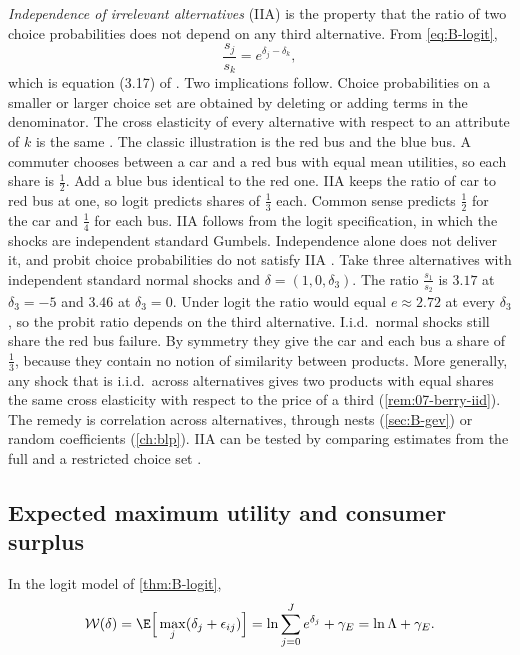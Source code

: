 \emph{Independence of irrelevant alternatives} (IIA) is the property that the ratio of two choice
probabilities does not depend on any third alternative. From \eqref{eq:B-logit},
\begin{equation}\label{eq:B-iia}
\frac{s_j}{s_k} = e^{\delta_j - \delta_k},
\end{equation}
which is equation (3.17) of \citet[p.~1413]{McFadden1984}. Two implications follow. Choice probabilities
on a smaller or larger choice set are obtained by deleting or adding terms in the denominator. The cross
elasticity of every alternative with respect to an attribute of $k$ is the same \citep[p.~1414]{McFadden1984}.
The classic illustration is the red bus and the blue bus. A commuter chooses between a car and a red bus
with equal mean utilities, so each share is $\frac{1}{2}$. Add a blue bus identical to the red one. IIA keeps
the ratio of car to red bus at one, so logit predicts shares of $\frac{1}{3}$ each. Common sense predicts
$\frac{1}{2}$ for the car and $\frac{1}{4}$ for each bus. IIA follows from the logit specification, in which
the shocks are independent standard Gumbels. Independence alone does not deliver it, and probit choice
probabilities do not satisfy IIA \citep[Section~5.4, p.~108]{Train2009}. Take three alternatives with
independent standard normal shocks and $\delta = (1, 0, \delta_3)$. The ratio $\frac{s_1}{s_2}$ is $3.17$ at
$\delta_3 = -5$ and $3.46$ at $\delta_3 = 0$. Under logit the ratio would equal $e \approx 2.72$ at every
$\delta_3$, so the probit ratio depends on the third alternative. I.i.d.\ normal shocks still share the red bus
failure. By symmetry they give the car and each bus a share of $\frac{1}{3}$, because they contain no notion of similarity
between products. More generally, any shock that is i.i.d.\ across alternatives gives two products with equal
shares the same cross elasticity with respect to the price of a third (\cref{rem:07-berry-iid}). The remedy is
correlation across alternatives, through nests (\cref{sec:B-gev}) or random coefficients (\cref{ch:blp}). IIA can be tested by comparing estimates from the full and a restricted choice set
\citep{HausmanMcFadden1984}.

\subsection{Expected maximum utility and consumer surplus}\label{sec:B-logsum}

\begin{proposition}\label{prop:B-logsum}
In the logit model of \cref{thm:B-logit},
\begin{equation}\label{eq:B-logsum}
\mathcal{W}(\delta) = \E\Big[\max_j(\delta_j + \epsilon_{ij})\Big] = \ln\sum_{j = 0}^Je^{\delta_j} + \gamma_E = \ln\Lambda + \gamma_E .
\end{equation}
\end{proposition}

